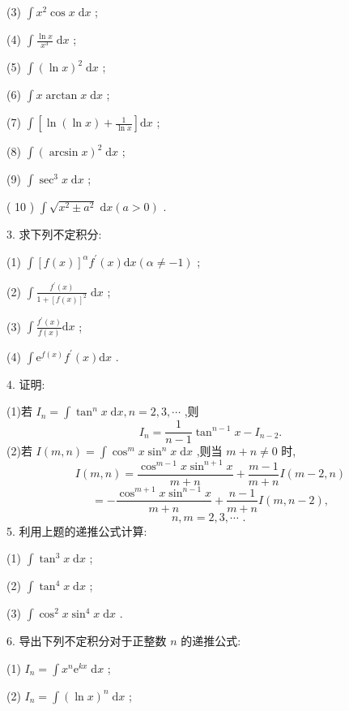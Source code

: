 (3) \(\int {x}^{2}\cos x\mathrm{\;d}x\) ;

(4) \(\int \frac{\ln x}{{x}^{3}}\mathrm{\;d}x\) ;

(5) \(\int {\left( \ln x\right) }^{2}\mathrm{\;d}x\) ;

(6) \(\int x\arctan x\mathrm{\;d}x\) ;

(7) \(\int \left\lbrack  {\ln \left( {\ln x}\right)  + \frac{1}{\ln x}}\right\rbrack  \mathrm{d}x\) ;

(8) \(\int {\left( \arcsin x\right) }^{2}\mathrm{\;d}x\) ;

(9) \(\int {\sec }^{3}x\mathrm{\;d}x\) ;

( 10 ) \(\int \sqrt{{x}^{2} \pm  {a}^{2}}\mathrm{\;d}x\left( {a > 0}\right)\) .

3. 求下列不定积分:

(1) \(\int {\left\lbrack  f\left( x\right) \right\rbrack  }^{\alpha }{f}^{\prime }\left( x\right) \mathrm{d}x\left( {\alpha  \neq   - 1}\right)\) ;

(2) \(\int \frac{{f}^{\prime }\left( x\right) }{1 + {\left\lbrack  f\left( x\right) \right\rbrack  }^{2}}\mathrm{\;d}x\) ;

(3) \(\int \frac{{f}^{\prime }\left( x\right) }{f\left( x\right) }\mathrm{d}x\) ;

(4) \(\int {\mathrm{e}}^{f\left( x\right) }{f}^{\prime }\left( x\right) \mathrm{d}x\) .

4. 证明:

(1)若 \({I}_{n} = \int {\tan }^{n}x\mathrm{\;d}x,n = 2,3,\cdots\) ,则
\[
{I}_{n} = \frac{1}{n - 1}{\tan }^{n - 1}x - {I}_{n - 2}.
\]
(2)若 \(I\left( {m,n}\right)  = \int {\cos }^{m}x{\sin }^{n}x\mathrm{\;d}x\) ,则当 \(m + n \neq  0\) 时,
\[
I\left( {m,n}\right)  = \frac{{\cos }^{m - 1}x{\sin }^{n + 1}x}{m + n} + \frac{m - 1}{m + n}I\left( {m - 2,n}\right)
\]
\[
=  - \frac{{\cos }^{m + 1}x{\sin }^{n - 1}x}{m + n} + \frac{n - 1}{m + n}I\left( {m,n - 2}\right) ,
\]
\[
n,m = 2,3,\cdots \text{ . }
\]
5. 利用上题的递推公式计算:

(1) \(\int {\tan }^{3}x\mathrm{\;d}x\) ;

(2) \(\int {\tan }^{4}x\mathrm{\;d}x\) ;

(3) \(\int {\cos }^{2}x{\sin }^{4}x\mathrm{\;d}x\) .

6. 导出下列不定积分对于正整数 \(n\) 的递推公式:

(1) \({I}_{n} = \int {x}^{n}{\mathrm{e}}^{kx}\mathrm{\;d}x\) ;

(2) \({I}_{n} = \int {\left( \ln x\right) }^{n}\mathrm{\;d}x\) ;

